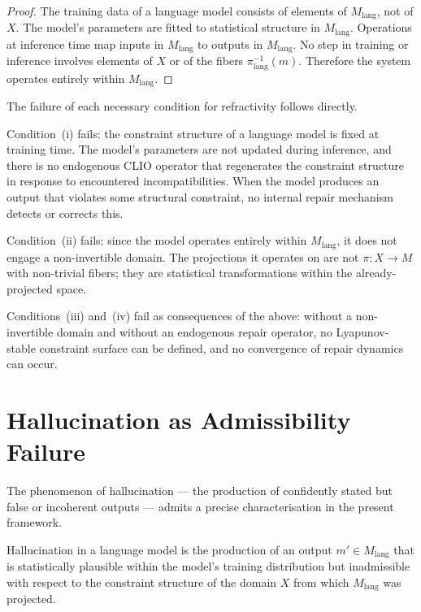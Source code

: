 \documentclass[11pt,openany]{book}
\begin{document}
\begin{proof}
The training data of a language model consists of elements
of $M_{\mathrm{lang}}$, not of $X$.  The model's parameters
are fitted to statistical structure in $M_{\mathrm{lang}}$.
Operations at inference time map inputs in $M_{\mathrm{lang}}$
to outputs in $M_{\mathrm{lang}}$.  No step in training or
inference involves elements of $X$ or of the fibers
$\pi_{\mathrm{lang}}^{-1}(m)$.  Therefore the system
operates entirely within $M_{\mathrm{lang}}$.
\end{proof}

The failure of each necessary condition for refractivity
follows directly.

Condition~(i) fails: the constraint structure of a language
model is fixed at training time.  The model's parameters
are not updated during inference, and there is no
endogenous CLIO operator that regenerates the constraint
structure in response to encountered incompatibilities.
When the model produces an output that violates some
structural constraint, no internal repair mechanism detects
or corrects this.

Condition~(ii) fails: since the model operates entirely
within $M_{\mathrm{lang}}$, it does not engage a
non-invertible domain.  The projections it operates on are
not $\pi : X \to M$ with non-trivial fibers; they are
statistical transformations within the already-projected
space.

Conditions~(iii) and~(iv) fail as consequences of the above:
without a non-invertible domain and without an endogenous
repair operator, no Lyapunov-stable constraint surface can
be defined, and no convergence of repair dynamics can occur.

\section{Hallucination as Admissibility Failure}
\label{sec:hallucination}

The phenomenon of hallucination — the production of
confidently stated but false or incoherent outputs — admits
a precise characterisation in the present framework.

\begin{proposition}
\label{prop:hallucination}
Hallucination in a language model is the production of an
output $m' \in M_{\mathrm{lang}}$ that is statistically
plausible within the model's training distribution but
inadmissible with respect to the constraint structure of
the domain $X$ from which $M_{\mathrm{lang}}$ was
projected.
\end{proposition}
\end{document}

